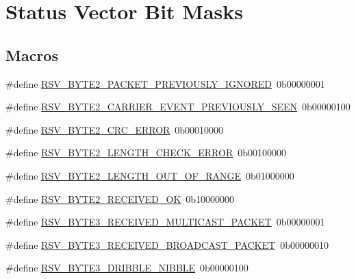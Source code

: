 \hypertarget{group___receive}{}\section{Status Vector Bit Masks}
\label{group___receive}
\subsection*{Macros}
\begin{DoxyCompactItemize}
\item 
\#define \mbox{\hyperlink{group___receive_gabb7a7f4cdbc591010a1e6fd94c444734}{R\+S\+V\+\_\+\+B\+Y\+T\+E2\+\_\+\+P\+A\+C\+K\+E\+T\+\_\+\+P\+R\+E\+V\+I\+O\+U\+S\+L\+Y\+\_\+\+I\+G\+N\+O\+R\+ED}}~0b00000001
\item 
\#define \mbox{\hyperlink{group___receive_gafcc8915d0220c1ed83eb1147ce4e9e09}{R\+S\+V\+\_\+\+B\+Y\+T\+E2\+\_\+\+C\+A\+R\+R\+I\+E\+R\+\_\+\+E\+V\+E\+N\+T\+\_\+\+P\+R\+E\+V\+I\+O\+U\+S\+L\+Y\+\_\+\+S\+E\+EN}}~0b00000100
\item 
\#define \mbox{\hyperlink{group___receive_gace08d6adf3cc71efe58de192f32e7eed}{R\+S\+V\+\_\+\+B\+Y\+T\+E2\+\_\+\+C\+R\+C\+\_\+\+E\+R\+R\+OR}}~0b00010000
\item 
\#define \mbox{\hyperlink{group___receive_ga6357e8c0947cbeac9db63de2eccb0ec7}{R\+S\+V\+\_\+\+B\+Y\+T\+E2\+\_\+\+L\+E\+N\+G\+T\+H\+\_\+\+C\+H\+E\+C\+K\+\_\+\+E\+R\+R\+OR}}~0b00100000
\item 
\#define \mbox{\hyperlink{group___receive_ga304b3ff7e33f76cb6266a42edc52c013}{R\+S\+V\+\_\+\+B\+Y\+T\+E2\+\_\+\+L\+E\+N\+G\+T\+H\+\_\+\+O\+U\+T\+\_\+\+O\+F\+\_\+\+R\+A\+N\+GE}}~0b01000000
\item 
\#define \mbox{\hyperlink{group___receive_gae48d0c27661f4863ec21153ceb5ad8b2}{R\+S\+V\+\_\+\+B\+Y\+T\+E2\+\_\+\+R\+E\+C\+E\+I\+V\+E\+D\+\_\+\+OK}}~0b10000000
\item 
\#define \mbox{\hyperlink{group___receive_ga8cd28365aea08543683d6477796fad4d}{R\+S\+V\+\_\+\+B\+Y\+T\+E3\+\_\+\+R\+E\+C\+E\+I\+V\+E\+D\+\_\+\+M\+U\+L\+T\+I\+C\+A\+S\+T\+\_\+\+P\+A\+C\+K\+ET}}~0b00000001
\item 
\#define \mbox{\hyperlink{group___receive_ga06f2e1468cb53ccaabf5f13d19881f77}{R\+S\+V\+\_\+\+B\+Y\+T\+E3\+\_\+\+R\+E\+C\+E\+I\+V\+E\+D\+\_\+\+B\+R\+O\+A\+D\+C\+A\+S\+T\+\_\+\+P\+A\+C\+K\+ET}}~0b00000010
\item 
\#define \mbox{\hyperlink{group___receive_ga97efdc2e71e9580117ca7b7b38218224}{R\+S\+V\+\_\+\+B\+Y\+T\+E3\+\_\+\+D\+R\+I\+B\+B\+L\+E\+\_\+\+N\+I\+B\+B\+LE}}~0b00000100

\end{DoxyCompactItemize}

